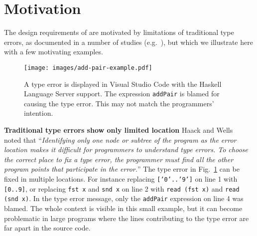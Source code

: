 
\section{Motivation}
The design requirements of \chameleon{} are motivated by limitations of traditional type errors, as documented in a number of studies (e.g.~\cite{Yang2000-wn, Hage2020-hg}), but which we illustrate here with a few motivating examples. 

\begin{figure}[ht]
    \centering
    \texttt{[image: images/add-pair-example.pdf]}
    \caption[A type error displayed in Visual Studio Code and the Haskell Vscode extension]{
    A type error is displayed in Visual Studio Code\cite{Microsoft_undated-hs} with the Haskell Language Server\cite{HLS-Developers2023-ot} support.
The expression \texttt{addPair} is blamed for causing the type error. This may not match the programmers' intention. 
    }
    \label{fig:motivation-example}
\end{figure}

\textbf{Traditional type errors show only limited location}
Haack and Wells~\cite{Haack2004-fr} noted that ``\textit{Identifying only one node or subtree of the program as the error location makes it difficult for programmers to understand type errors. To choose the correct place to fix a type error, the programmer must find all the other program points that participate in the error.}'' The type error in Fig.~\ref{fig:motivation-example} can be fixed in multiple locations. For instance  replacing \texttt{['0'..'9']} on line 1 with \texttt{[0..9]}, or replacing \texttt{fst x} and \texttt{snd x} on line 2 with \texttt {read (fst x)} and \texttt{read (snd  x)}. In the type error message, only the \texttt{addPair} expression on line 4 was blamed.  The whole context is visible in this small example, but it can become problematic in large programs where the lines contributing to the type error are far apart in the source code.

